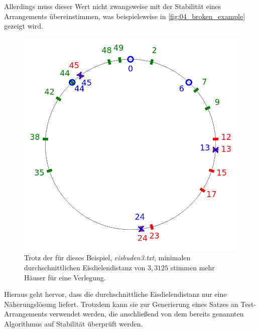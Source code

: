 \documentclass[a4paper,10pt,ngerman]{scrartcl}
\newcommand{\imageWidth}{0.3\linewidth}
\begin{document}
Allerdings muss dieser Wert nicht zwangsweise mit der Stabilität eines Arrangements übereinstimmen, was beispielsweise in \autoref{fig:04_broken_example} gezeigt wird.
\begin{figure}[h!]
    \centering
    \caption{Trotz der für dieses Beispiel, \textit{eisbuden3.txt}, minimalen durchschnittlichen Eisdielendistanz von $3,3125$ stimmen mehr Häuser für eine Verlegung.}
    \label{fig:04_broken_example}
    \includegraphics[width=\imageWidth]{04_broken_example.png}
\end{figure}
Hieraus geht hervor, dass die durchschnittliche Eisdielendistanz nur eine Näherungslösung liefert.
Trotzdem kann sie zur Generierung eines Satzes an Test-Arrangements verwendet werden, die anschließend von dem bereits genannten Algorithmus auf Stabilität überprüft werden.
\end{document}
